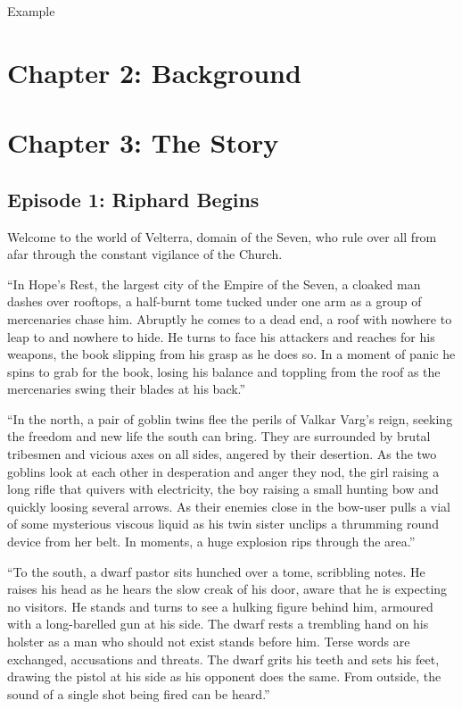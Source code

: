\documentclass[letterpaper,10pt,twoside,twocolumn,openany]{book}
\begin{document}
\begin{paperbox}{Example}
  \lipsum[2]
\end{paperbox}

\clearpage





\chapter{Chapter 2: Background}


\clearpage

\chapter{Chapter 3: The Story}

\section{Episode 1: Riphard Begins}

Welcome to the world of Velterra, domain of the Seven, who rule over all from afar through the constant vigilance of the Church.

“In Hope’s Rest, the largest city of the Empire of the Seven, a cloaked man dashes over rooftops, a half-burnt tome tucked under one arm as a group of mercenaries chase him. Abruptly he comes to a dead end, a roof with nowhere to leap to and nowhere to hide. He turns to face his attackers and reaches for his weapons, the book slipping from his grasp as he does so. In a moment of panic he spins to grab for the book, losing his balance and toppling from the roof as the mercenaries swing their blades at his back.”

“In the north, a pair of goblin twins flee the perils of Valkar Varg’s reign, seeking the freedom and new life the south can bring. They are surrounded by brutal tribesmen and vicious axes on all sides, angered by their desertion. As the two goblins look at each other in desperation and anger they nod, the girl raising a long rifle that quivers with electricity, the boy raising a small hunting bow and quickly loosing several arrows. As their enemies close in the bow-user pulls a vial of some mysterious viscous liquid as his twin sister unclips a thrumming round device from her belt. In moments, a huge explosion rips through the area.”

“To the south, a dwarf pastor sits hunched over a tome, scribbling notes. He raises his head as he hears the slow creak of his door, aware that he is expecting no visitors. He stands and turns to see a hulking figure behind him, armoured with a long-barelled gun at his side. The dwarf rests a trembling hand on his holster as a man who should not exist stands before him. Terse words are exchanged, accusations and threats. The dwarf grits his teeth and sets his feet, drawing the pistol at his side as his opponent does the same. From outside, the sound of a single shot being fired can be heard.”
\end{document}
